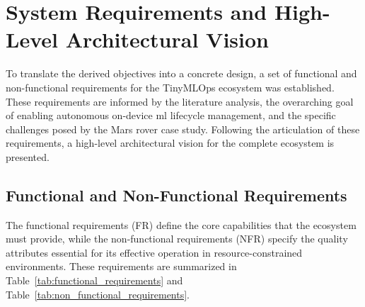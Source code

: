 \section{System Requirements and High-Level Architectural Vision}
\label{sec:framework_requirements_vision}

To translate the derived objectives into a concrete design, a set of functional and non-functional requirements for the TinyMLOps ecosystem was established. These requirements are informed by the literature analysis, the overarching goal of enabling autonomous on-device \gls{ml} lifecycle management, and the specific challenges posed by the Mars rover case study. Following the articulation of these requirements, a high-level architectural vision for the complete ecosystem is presented.

\subsection{Functional and Non-Functional Requirements}
\label{ssec:framework_requirements}

The functional requirements (FR) define the core capabilities that the ecosystem must provide, while the non-functional requirements (NFR) specify the quality attributes essential for its effective operation in resource-constrained environments. These requirements are summarized in Table~\ref{tab:functional_requirements} and Table~\ref{tab:non_functional_requirements}.

